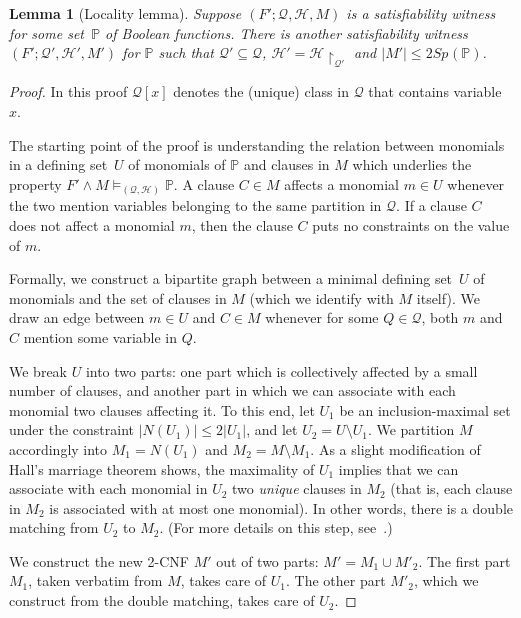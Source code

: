 \documentclass[11pt]{article}
\numberwithin{equation}{section}
\newtheorem{lemma}[theorem]{Lemma}
\theoremstyle{definition}
\theoremstyle{plain}
\theoremstyle{plain}
\theoremstyle{definition}
\newcommand{\setsize}[1]{\lvert#1\rvert}
\newcommand{\union}{\cup}
\newcommand{\polynomialsetformat}[1]{\mathbb{#1}}
\newcommand{\pcsp}{\polynomialsetformat{P}}
\newcommand{\restrict}[2]{{{#1}\!\!\upharpoonright_{#2}}}
\newcommand{\genericformsmall}[2]{\mathit{#1}( #2 )}
\newcommand{\mspaceof}[2][]{\genericformsmall{Sp_{#1}}{#2}}
\newcommand{\BGmodels}[2]{\models_{(#1,#2)}}
\newcommand{\partialmodels}{\BGmodels{\partitionnot}{\assignmentsetnot}}
\newcommand{\BGpart}[1]{\partitionnot[#1]}
\newcommand{\satwitness}[1][]{(F';\partitionnot #1, \assignmentsetnot #1, M #1)}
\newcommand{\partitionnot}{\mathcal{Q}}
\newcommand{\assignmentsetnot}{\mathcal{H}}
\begin{document}
\begin{lemma}[Locality lemma]
  \label{lem:locality}
  Suppose $\satwitness$ is a satisfiability witness for some %
  set~$\pcsp$ of Boolean functions.
  There is another satisfiability witness $\satwitness[']$ for $\pcsp$ such that $\partitionnot' \subseteq \partitionnot$, $\assignmentsetnot' = \restrict{\assignmentsetnot}{\partitionnot'}$ and $\setsize{M'} \leq 2\mspaceof{\pcsp}$.
\end{lemma}
\begin{proof}
In this proof $\BGpart{x}$ denotes the (unique) class in
$\partitionnot$ that contains variable $x$.

The starting point of the proof is understanding the relation between monomials in a %
defining set~$U$ of monomials
of $\pcsp$ and clauses in $M$ which underlies the property $F'\land M \partialmodels \pcsp$. A clause $C \in M$ affects a monomial $m \in U$ whenever the two mention variables belonging to the same partition in $\partitionnot$. If a clause $C$ does not affect a monomial $m$, then the clause $C$ puts no constraints on the value of $m$.

Formally, we construct a bipartite graph between a minimal %
defining set~$U$ of monomials
and the set of clauses in $M$ (which we identify with $M$ itself). We draw an edge between $m \in U$ and $C \in M$ whenever for some $Q \in \partitionnot$, both $m$ and $C$ mention some variable in $Q$.

We break $U$ into two parts: one part which is collectively affected by a small number of clauses, and another part in which we can associate with each monomial two clauses affecting it. To this end, let $U_1$ be an inclusion-maximal set under the constraint $\setsize{N(U_1)}\leq 2\setsize{U_1}$, and let $U_2=U\setminus U_1$. We partition $M$ accordingly into $M_1 = N(U_1)$ and $M_2 = M \setminus M_1$. As a slight modification of Hall's marriage theorem shows, the maximality of $U_1$ implies that we can associate with each monomial in $U_2$ two \emph{unique} clauses in $M_2$ (that is, each clause in $M_2$ is associated with at most one monomial). In other words, there is a double matching from $U_2$ to $M_2$. (For more details on this step, see~\cite{ABRW02SpaceComplexity,FLNRT15SpaceCplx,BG15Framework}.)

%

We construct the new 2-CNF $M'$ out of two parts: $M' = M_1 \union M'_2$. The first part $M_1$, taken verbatim from $M$, takes care of $U_1$. The other part $M'_2$, which we construct from the double matching, takes care of $U_2$.


\end{proof}
\end{document}
